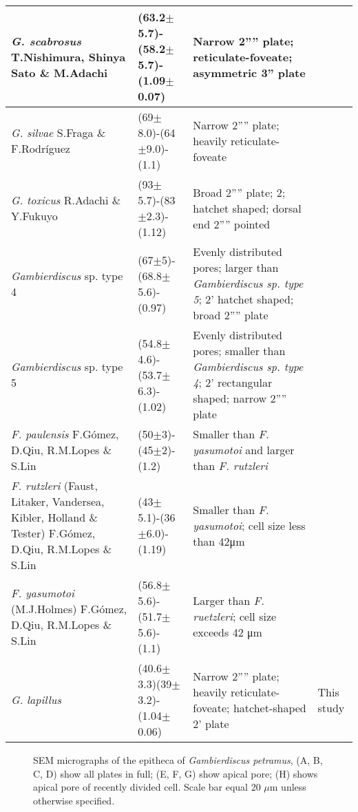 \documentclass[12pt]{article}
\begin{document}
\begin{longtable}{ | p{5cm} | p{2cm} | p{6cm} | p{2cm} |}
 \hline
\textit{G. scabrosus} T.Nishimura, Shinya Sato \& M.Adachi	& (63.2$\pm$5.7)-(58.2$\pm$5.7)-(1.09$\pm$0.07) & Narrow 2'''' plate; reticulate-foveate; asymmetric 3” plate & \citep{nishimura2014morphology,nishimura2013genetic,kuno2010genetic}  \\
 \hline
 \textit{G. silvae}	S.Fraga \& F.Rodr{\'i}guez & (69$\pm$8.0)-(64$\pm$9.0)-(1.1) & Narrow 2'''' plate; heavily reticulate-foveate & \citep{fraga2014genus,litaker2010global} \\
 \hline
\textit{G. toxicus} R.Adachi \& Y.Fukuyo & (93$\pm$5.7)-(83$\pm$2.3)-(1.12) & Broad 2'''' plate; 2; hatchet shaped; dorsal end 2'''' pointed & \citep{litaker2009taxonomy,adachi1979thecal,chinain1997intraspecific,richlen2008phylogeography}\\
 \hline
 \emph{Gambierdiscus} sp. type 4	& (67$\pm$5)-(68.8$\pm$5.6)-(0.97) & Evenly distributed pores; larger than \textit{Gambierdiscus sp. type 5}; 2’ hatchet shaped; broad 2'''' plate 
 & \citep{xu2014distribution}\\
 \hline
 \emph{Gambierdiscus} sp. type 5 & (54.8$\pm$4.6)-(53.7$\pm$6.3)-(1.02) & Evenly distributed pores; smaller than \textit{Gambierdiscus sp. type 4}; 2’ rectangular shaped; narrow 2'''' plate &  \citep{xu2014distribution} \\
 \hline
 \textit{F. paulensis} F.Gómez, D.Qiu, R.M.Lopes \& S.Lin & (50$\pm$3)-(45$\pm$2)-(1.2) & Smaller than \textit{F. yasumotoi} and larger than \textit{F. rutzleri} & \citep{gomez2015fukuyoa} \\
 \hline
\textit{F. rutzleri }(Faust, Litaker, Vandersea, Kibler, Holland \& Tester) F.Gómez, D.Qiu, R.M.Lopes \& S.Lin& (43$\pm$5.1)-(36$\pm$6.0)-(1.19) & Smaller than \textit{F. yasumotoi}; cell size less than 42μm &  \citep{litaker2009taxonomy}\\
 \hline
\textit{F. yasumotoi }(M.J.Holmes) F.Gómez, D.Qiu, R.M.Lopes \& S.Lin& (56.8$\pm$5.6)-(51.7$\pm$5.6)-(1.1) & Larger than \textit{F. ruetzleri}; cell size exceeds 42 μm & \citep{litaker2009taxonomy,holmes1998gambierdiscus}  \\
 \hline
\textit{G. lapillus}  & (40.6$\pm$3.3)(39$\pm$3.2)-(1.04$\pm$0.06) & Narrow 2'''' plate; heavily reticulate-foveate; hatchet-shaped 2' plate & This study\\
   \hline
\end{longtable}
\FloatBarrier



\FloatBarrier 
\begin{figure} 
\caption{SEM micrographs of the epitheca of \emph{Gambierdiscus petramus}, (A, B, C, D) show all plates in full; (E, F, G) show apical pore; (H) shows apical pore of recently divided cell. Scale bar equal 20 $\mu$m unless otherwise specified.} 
\label{fig:epiSEM}
\end{figure} 
\FloatBarrier 
\end{document}
